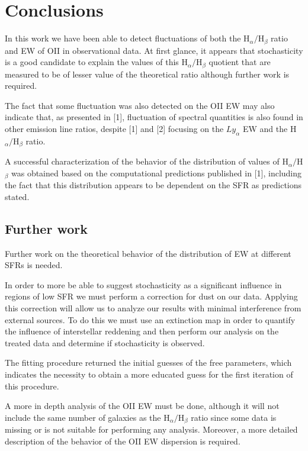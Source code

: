 \chapter{Conclusions}

In this work we have been able to detect fluctuations of both the H$_{\alpha}/$H$_{\beta}$ ratio and EW of OII in observational data. At first
glance, it appears that stochasticity is a good candidate to explain the values of this H$_{\alpha}/$H$_{\beta}$ quotient that are measured to be
of lesser value of the theoretical ratio although further work is required.

The fact that some fluctuation was also detected on the OII EW may also indicate that, as presented in [1], fluctuation of spectral quantities is
also found in other emission line ratios, despite [1] and [2] focusing on the $Ly_{\alpha}$ EW and the H$_{\alpha}/$H$_{\beta}$ ratio.

A successful characterization of the behavior of the distribution of values of H$_{\alpha}/$H$_{\beta}$ was obtained based on the computational
predictions published in [1], including the fact that this distribution appears to be dependent on the SFR as predictions stated.

\section{Further work}

Further work on the theoretical behavior of the distribution of EW at different SFRs is needed.

In order to more be able to suggest stochasticity as a significant influence in regions of low SFR we must perform a correction for dust on our data.
Applying this correction will allow us to analyze our results with minimal interference from external sources. To do this we must use an extinction
map in order to quantify the influence of interstellar reddening and then perform our analysis on the treated data and determine if stochasticity is
observed.

The fitting procedure returned the initial guesses of the free parameters, which indicates the necessity to obtain a more educated guess for the first
iteration of this procedure.

A more in depth analysis of the OII EW must be done, although it will not include the same number of galaxies as the H$_{\alpha}/$H$_{\beta}$ ratio
since some data is missing or is not suitable for performing any analysis. Moreover, a more detailed description of the behavior of the OII EW
dispersion is required.

